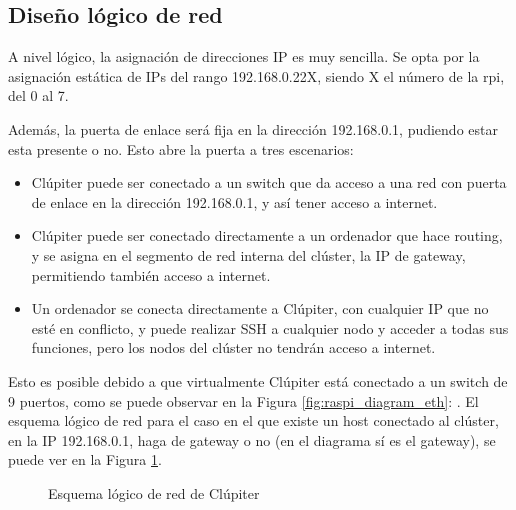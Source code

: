 \subsection{Diseño lógico de red}
A nivel lógico, la asignación de direcciones IP es muy sencilla. Se opta por la asignación estática de IPs del rango 192.168.0.22X, siendo X el número de la \acrlong{rpi}, del 0 al 7.

Además, la puerta de enlace será fija en la dirección 192.168.0.1, pudiendo estar esta presente o no. Esto abre la puerta a tres escenarios:
\begin{itemize}
    \item Clúpiter puede ser conectado a un switch que da acceso a una red con puerta de enlace en la dirección 192.168.0.1, y así tener acceso a internet.
    \item Clúpiter puede ser conectado directamente a un ordenador que hace routing, y se asigna en el segmento de red interna del clúster, la IP de gateway, permitiendo también acceso a internet.
    \item Un ordenador se conecta directamente a Clúpiter, con cualquier IP que no esté en conflicto, y puede realizar SSH a cualquier nodo y acceder a todas sus funciones, pero los nodos del clúster no tendrán acceso a internet.
\end{itemize}

Esto es posible debido a que virtualmente Clúpiter está conectado a un switch de 9 puertos, como se puede observar en la Figura \ref{fig:raspi_diagram_eth}: . El esquema lógico de red para el caso en el que existe un host conectado al clúster, en la IP 192.168.0.1, haga de gateway o no (en el diagrama sí es el gateway), se puede ver en la Figura \ref{fig:raspi_diagram_logical}.

\begin{figure}[h!]
  \centering
  \vspace*{0.5cm}
  \def\svgwidth{0.9\textwidth}
  
  \caption{Esquema lógico de red de Clúpiter}
  \label{fig:raspi_diagram_logical}
\end{figure}